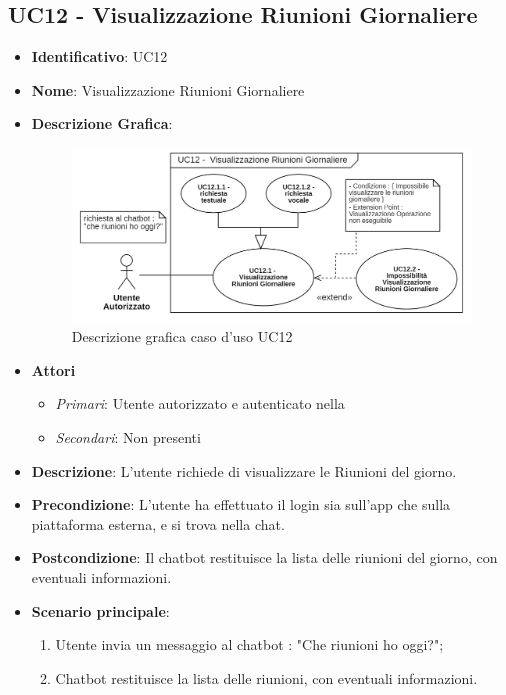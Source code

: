 \subsection{UC12 - Visualizzazione Riunioni Giornaliere }
\begin{itemize}
	\item \textbf{Identificativo}: UC12
	\item \textbf{Nome}: Visualizzazione Riunioni Giornaliere
	\item\textbf{Descrizione Grafica}: 
	\begin{figure}[h]
		\centering
		\includegraphics[scale=0.60]{images/UC12.png}
		\caption{Descrizione grafica caso d'uso UC12}
	 \end{figure}

	\item \textbf{Attori}
	\begin{itemize} 
		\item \textit{Primari}: Utente autorizzato e autenticato nella 
		\item \textit{Secondari}: Non presenti
	\end{itemize}
	\item \textbf{Descrizione}: L'utente richiede di visualizzare le Riunioni del giorno.
	\item \textbf{Precondizione}: L'utente ha effettuato il login sia sull'app che sulla piattaforma esterna, e si trova nella chat.
	\item \textbf{Postcondizione}: Il chatbot restituisce la lista delle riunioni del giorno, con eventuali informazioni.
	\item \textbf{Scenario principale}:  \begin{enumerate}
		\item Utente invia un messaggio al chatbot : "Che riunioni ho oggi?";
		\item Chatbot restituisce la lista delle riunioni, con eventuali informazioni.
	\end{enumerate}
\end{itemize}

